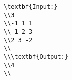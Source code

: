 \begin{verbatim}
\textbf{Input:}
\\3
\\-1 1 1
\\-1 2 3
\\2 3 -2
\\
\\\textbf{Output:}
\\4
\\\end{verbatim}